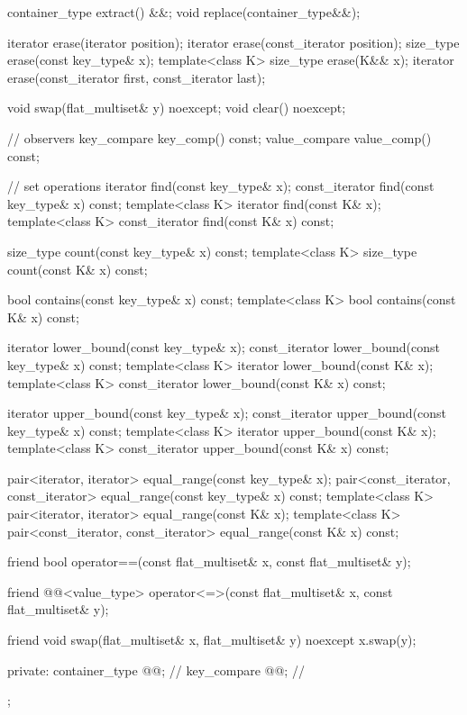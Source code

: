 \begin{codeblock}
{{    container_type extract() &&;
    void replace(container_type&&);

    iterator erase(iterator position);
    iterator erase(const_iterator position);
    size_type erase(const key_type& x);
    template<class K> size_type erase(K&& x);
    iterator erase(const_iterator first, const_iterator last);

    void swap(flat_multiset& y) noexcept;
    void clear() noexcept;

    // observers
    key_compare key_comp() const;
    value_compare value_comp() const;

    // set operations
    iterator find(const key_type& x);
    const_iterator find(const key_type& x) const;
    template<class K> iterator find(const K& x);
    template<class K> const_iterator find(const K& x) const;

    size_type count(const key_type& x) const;
    template<class K> size_type count(const K& x) const;

    bool contains(const key_type& x) const;
    template<class K> bool contains(const K& x) const;

    iterator lower_bound(const key_type& x);
    const_iterator lower_bound(const key_type& x) const;
    template<class K> iterator lower_bound(const K& x);
    template<class K> const_iterator lower_bound(const K& x) const;

    iterator upper_bound(const key_type& x);
    const_iterator upper_bound(const key_type& x) const;
    template<class K> iterator upper_bound(const K& x);
    template<class K> const_iterator upper_bound(const K& x) const;

    pair<iterator, iterator> equal_range(const key_type& x);
    pair<const_iterator, const_iterator> equal_range(const key_type& x) const;
    template<class K>
      pair<iterator, iterator> equal_range(const K& x);
    template<class K>
      pair<const_iterator, const_iterator> equal_range(const K& x) const;

    friend bool operator==(const flat_multiset& x, const flat_multiset& y);

    friend @@<value_type>
      operator<=>(const flat_multiset& x, const flat_multiset& y);

    friend void swap(flat_multiset& x, flat_multiset& y) noexcept
      { x.swap(y); }

  private:
    container_type @@;           // \expos
    key_compare @@;        // \expos
  };

}
\end{codeblock}

